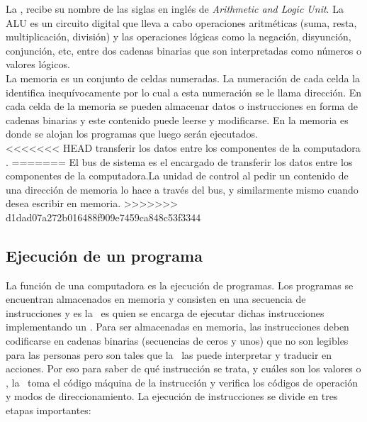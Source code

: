 La \ALU, recibe su nombre de las siglas en inglés de \textit{Arithmetic and Logic Unit}. La ALU es un circuito digital que lleva a cabo operaciones aritméticas (suma, resta, multiplicación, división) y las operaciones lógicas como la negación, disyunción, conjunción, etc, entre dos cadenas binarias que son interpretadas como números o valores lógicos.\\

La memoria es un conjunto de celdas numeradas. La numeración de cada celda la identifica inequívocamente por lo cual a esta numeración se le llama dirección. En cada celda de la memoria se pueden almacenar datos o instrucciones en forma de cadenas binarias y este contenido puede leerse y modificarse. En la memoria es donde se alojan los programas que luego serán ejecutados.\\

<<<<<<< HEAD
 transferir los datos entre los componentes de la computadora .
=======
El bus de sistema es el encargado de transferir los datos entre los componentes de la computadora.La unidad de control al pedir un contenido de una dirección de memoria lo hace a través del bus, y similarmente mismo cuando desea escribir en memoria.
>>>>>>> d1dad07a272b016488f909e7459ca848c53f3344

\subsection{Ejecución de un programa}

La función de una computadora es la ejecución de programas. Los programas se encuentran almacenados en memoria y consisten en una secuencia de instrucciones y es la \UC\ es quien se encarga de ejecutar dichas instrucciones implementando un \textbf{\ciclo}. Para ser almacenadas en memoria, las instrucciones deben codificarse en cadenas binarias (secuencias de ceros y unos) que no son legibles para las personas pero son tales que la \UC\ las puede interpretar y traducir en acciones. Por eso para saber de qué instrucción se trata, y cuáles son los valores o , la \UC\ toma el código máquina de la instrucción y verifica los códigos de operación y modos de direccionamiento. La ejecución de instrucciones se divide en tres etapas importantes: 


